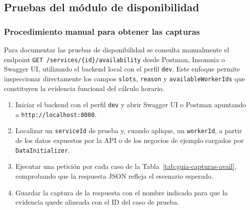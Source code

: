 \documentclass[12pt,a4paper,twoside]{report}
\begin{document}
\subsection{Pruebas del módulo de disponibilidad}

\subsubsection{Procedimiento manual para obtener las capturas}

Para documentar las pruebas de disponibilidad se consulta manualmente el endpoint \texttt{GET /services/\{id\}/availability} desde Postman, Insomnia o Swagger UI, utilizando el backend local con el perfil \texttt{dev}. Este enfoque permite inspeccionar directamente los campos \texttt{slots}, \texttt{reason} y \texttt{availableWorkerIds} que constituyen la evidencia funcional del cálculo horario.
\begin{enumerate}
  \item Iniciar el backend con el perfil \texttt{dev} y abrir Swagger UI o Postman apuntando a \texttt{http://localhost:8080}.
  \item Localizar un \texttt{serviceId} de prueba y, cuando aplique, un \texttt{workerId}, a partir de los datos expuestos por la API o de los negocios de ejemplo cargados por \texttt{DataInitializer}.
  \item Ejecutar una petición por cada caso de la Tabla~\ref{tab:guia-capturas-avail}, comprobando que la respuesta JSON refleja el escenario esperado.
  \item Guardar la captura de la respuesta con el nombre indicado para que la evidencia quede alineada con el ID del caso de prueba.
\end{enumerate}
\end{document}
